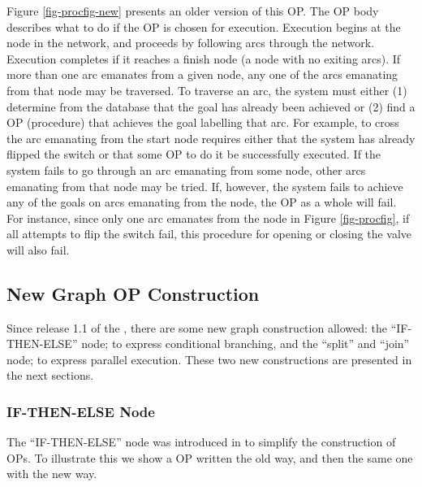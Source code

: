 Figure \ref{fig-procfig-new} presents an older version of this OP. The OP body
describes what to do if the OP is chosen for execution.  Execution begins at
the  node in the network, and proceeds by following arcs through
the network. Execution completes if it reaches a finish node (a node with no
exiting arcs). If more than one arc emanates from a given node, any one of the
arcs emanating from that node may be traversed. To traverse an arc, the system
must either (1) determine from the database that the goal has already been
achieved or (2) find a OP (procedure) that achieves the goal labelling that
arc. For example, to cross the arc emanating from the start node requires
either that the system has already flipped the switch or that some OP to do it
be successfully executed. If the system fails to go through an arc emanating
from some node, other arcs emanating from that node may be tried.  If, however,
the system fails to achieve any of the goals on arcs emanating from the node,
the OP as a whole will fail. For instance, since only one arc emanates from the
 node in Figure \ref{fig-procfig}, if all attempts to flip the
switch fail, this procedure for opening or closing the valve will also fail.

\subsection{New Graph OP Construction}

Since release 1.1 of the \COPRSDE{}, there are some new graph construction
allowed: the ``IF-THEN-ELSE'' node; to express conditional branching, and the
``split'' and ``join'' node; to express parallel execution. These two new
constructions are presented in the next sections.



\subsubsection{IF-THEN-ELSE Node}

The ``IF-THEN-ELSE'' node was introduced in \COPRS{} to simplify the
construction of OPs. To illustrate this we show a OP written the old way, and
then the same one with the new way.


